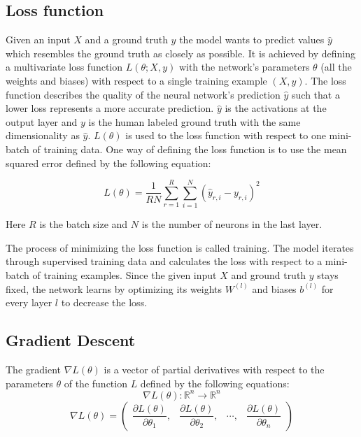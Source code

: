\documentclass[a4paper, twoside]{article}
\newcommand*{\pd}[2]{\ensuremath{\dfrac{\partial #1}{\partial #2}}}
\begin{document}
\subsection{Loss function}
Given an input $X$ and a ground truth $y$ the model wants to predict values $\hat{y}$ which resembles the ground truth as closely as possible. It is achieved by defining a multivariate loss function $L(\theta; X, y)$  with the network's parameters $\theta$ (all the weights and biases) with respect to a single training example $(X, y)$. The loss function describes the quality of the neural network's prediction $\hat{y}$ such that a lower loss represents a more accurate prediction. $\hat{y}$ is the activations at the output layer and $y$ is the human labeled ground truth with the same dimensionality as $\hat{y}$. $L(\theta)$ is used to the loss function with respect to one mini-batch of training data. One way of defining the loss function is to use the mean squared error defined by the following equation: \cite{cs231n}

\begin{equation}\label{MSE}
L(\theta) = \frac{1}{RN} \sum^{R}_{r=1} \sum^{N}_{i=1} (\hat{y}_{r,i}-y_{r,i})^2
\end{equation}

Here $R$ is the batch size and $N$ is the number of neurons in the last layer.

The process of minimizing the loss function is called training. The model iterates through supervised training data and calculates the loss with respect to a mini-batch of training examples. Since the given input $X$ and ground truth $y$ stays fixed, the network learns by optimizing its weights $W^{(l)}$ and biases $b^{(l)}$ for every layer $l$ to decrease the loss. \cite{cs231n} \cite{wikiStanford}

\subsection{Gradient Descent}
The gradient $\nabla L(\theta)$ is a vector of partial derivatives with respect to the parameters $\theta$ of the function $L$ defined by the following equations: \cite{gradient} \cite{convmath} 
\begin{equation}\label{EQgradientspace}
\nabla L(\theta) : \mathbb{R}^n \to \mathbb{R}^n
\end{equation}
\begin{equation}\label{EQgradientvector}
\nabla L(\theta) = 
	\begin{pmatrix} 
		\pd{L(\theta)}{\theta_{1}}, & 
		\pd{L(\theta)}{\theta_{2}}, &
		\cdots, &
		\pd{L(\theta)}{\theta_{n}}
		
		\end{pmatrix}
\end{equation}
\end{document}
